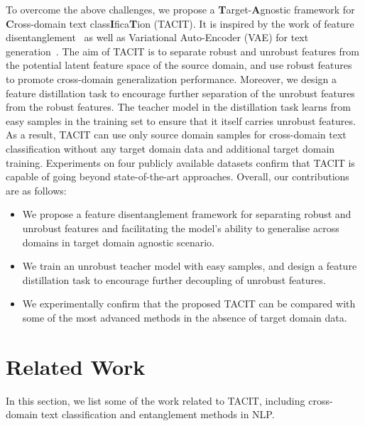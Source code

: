 \documentclass[letterpaper]{article} %
\begin{document}
To overcome the above challenges, we propose a \textbf{T}arget-\textbf{A}gnostic framework for \textbf{C}ross-domain text class\textbf{I}fica\textbf{T}ion (TACIT). It is inspired by the work of feature disentanglement~\cite{HuangZCWY21} as well as Variational Auto-Encoder (VAE) for text generation~\cite{BaoZHLMVDC19}. The aim of TACIT is to separate robust and unrobust features from the potential latent feature space of the source domain, and use robust features to promote cross-domain generalization performance. Moreover, we design a feature distillation task to encourage further separation of the unrobust features from the robust features. The teacher model in the distillation task learns from easy samples in the training set to ensure that it itself carries unrobust features. As a result, TACIT can use only source domain samples for cross-domain text classification without any target domain data and additional target domain training. Experiments on four publicly available datasets confirm that TACIT is capable of going beyond state-of-the-art approaches. Overall, our contributions are as follows:
\begin{itemize}
	\item We propose a feature disentanglement framework for separating robust and unrobust features and facilitating the model's ability to generalise across domains in target domain agnostic scenario.
	\item We train an unrobust teacher model with easy samples, and design a feature distillation task to encourage further decoupling of unrobust features.
	\item We experimentally confirm that the proposed TACIT can be compared with some of the most advanced methods in the absence of target domain data.
\end{itemize}

\section{Related Work}\label{sec:work}
In this section, we list some of the work related to TACIT, including cross-domain text classification and entanglement methods in NLP.
\end{document}
